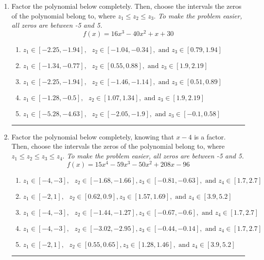\documentclass[14pt]{extbook}
\newcommand{\litem}[1]{\item#1\hspace*{-1cm}\rule{\textwidth}{0.4pt}}
\begin{document}
\begin{enumerate}
{\begin{enumerate}[label=\Alph*.]
\end{enumerate} }
\litem{
Factor the polynomial below completely. Then, choose the intervals the zeros of the polynomial belong to, where $z_1 \leq z_2 \leq z_3$. \textit{To make the problem easier, all zeros are between -5 and 5.}\[ f(x) = 16x^{3} -40 x^{2} +x + 30 \]\begin{enumerate}[label=\Alph*.]
\item \( z_1 \in [-2.25, -1.94], \text{   }  z_2 \in [-1.04, -0.34], \text{   and   } z_3 \in [0.79, 1.94] \)
\item \( z_1 \in [-1.34, -0.77], \text{   }  z_2 \in [0.55, 0.88], \text{   and   } z_3 \in [1.9, 2.19] \)
\item \( z_1 \in [-2.25, -1.94], \text{   }  z_2 \in [-1.46, -1.14], \text{   and   } z_3 \in [0.51, 0.89] \)
\item \( z_1 \in [-1.28, -0.5], \text{   }  z_2 \in [1.07, 1.34], \text{   and   } z_3 \in [1.9, 2.19] \)
\item \( z_1 \in [-5.28, -4.63], \text{   }  z_2 \in [-2.05, -1.9], \text{   and   } z_3 \in [-0.1, 0.58] \)

\end{enumerate} }
\litem{
Factor the polynomial below completely, knowing that $x -4$ is a factor. Then, choose the intervals the zeros of the polynomial belong to, where $z_1 \leq z_2 \leq z_3 \leq z_4$. \textit{To make the problem easier, all zeros are between -5 and 5.}\[ f(x) = 15x^{4} -59 x^{3} -50 x^{2} +208 x -96 \]\begin{enumerate}[label=\Alph*.]
\item \( z_1 \in [-4, -3], \text{   }  z_2 \in [-1.68, -1.66], z_3 \in [-0.81, -0.63], \text{   and   } z_4 \in [1.7, 2.7] \)
\item \( z_1 \in [-2, 1], \text{   }  z_2 \in [0.62, 0.9], z_3 \in [1.57, 1.69], \text{   and   } z_4 \in [3.9, 5.2] \)
\item \( z_1 \in [-4, -3], \text{   }  z_2 \in [-1.44, -1.27], z_3 \in [-0.67, -0.6], \text{   and   } z_4 \in [1.7, 2.7] \)
\item \( z_1 \in [-4, -3], \text{   }  z_2 \in [-3.02, -2.95], z_3 \in [-0.44, -0.14], \text{   and   } z_4 \in [1.7, 2.7] \)
\item \( z_1 \in [-2, 1], \text{   }  z_2 \in [0.55, 0.65], z_3 \in [1.28, 1.46], \text{   and   } z_4 \in [3.9, 5.2] \)


\end{enumerate}}
\end{enumerate}
\end{document}
